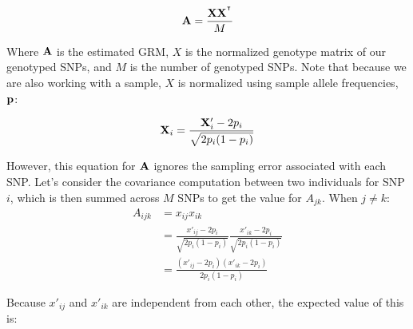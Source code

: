 \documentclass[12pt]{article}
\begin{document}
$$ \mathbf{A} = \frac{\mathbf{X} \mathbf{X}^{^\intercal}}{M} $$

Where $\mathbf{A}$ is the estimated GRM, $X$ is the normalized genotype matrix of our genotyped SNPs, and $M$ is the number of genotyped SNPs.
Note that because we are also working with a sample, $X$ is normalized using sample allele frequencies, $\mathbf{p}$:

$$ \mathbf{X}_i = \frac{\mathbf{X}'_i - 2 p_i}{\sqrt{2 p_i (1 - p_i)}} $$

However, this equation for $\mathbf{A}$ ignores the sampling error associated with each SNP.
Let's consider the covariance computation between two individuals for SNP $i$, which is then summed across $M$ SNPs to get the value for $A_{jk}$.
When $j \neq k$:
\begin{align*}
    A_{ijk} &= x_{ij} x_{ik} \\
    &= \frac{x'_{ij} - 2 p_i}{\sqrt{2 p_i (1 - p_i)}}
    \frac{x'_{ik} - 2 p_i}{\sqrt{2 p_i (1 - p_i)}} \\
    &= \frac{(x'_{ij} - 2 p_i)(x'_{ik} - 2 p_i)}{2 p_i (1 - p_i)}
\end{align*}

Because $x'_{ij}$ and $x'_{ik}$ are independent from each other, the expected value of this is:
\end{document}

